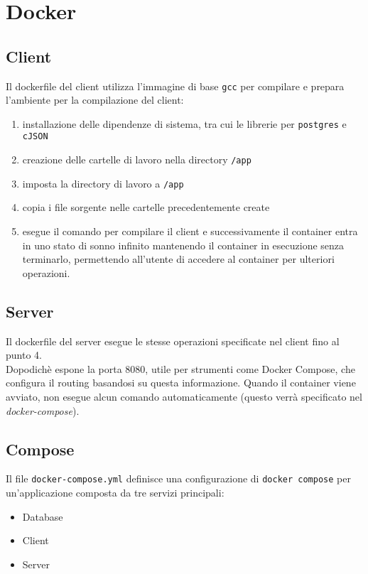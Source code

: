 \documentclass[]{report}
\begin{document}
\chapter{Docker}
\section{Client}
Il dockerfile del client utilizza l'immagine di base \texttt{gcc} per compilare e prepara l'ambiente per la compilazione del client:
\begin{enumerate}
	\item installazione delle dipendenze di sistema, tra cui le librerie per \texttt{postgres} e \texttt{cJSON}
	\item creazione delle cartelle di lavoro nella directory \texttt{/app}
	\item imposta la directory di lavoro a \texttt{/app}
	\item copia i file sorgente nelle cartelle precedentemente create
	\item esegue il comando per compilare il client e successivamente il container entra in uno stato di sonno infinito mantenendo il container in esecuzione senza terminarlo, permettendo all'utente di accedere al container per ulteriori operazioni.
\end{enumerate}

\section{Server}
Il dockerfile del server esegue le stesse operazioni specificate nel client fino al punto 4.\\
Dopodichè espone la porta 8080, utile per strumenti come Docker Compose, che configura il routing basandosi su questa informazione.\sskip
Quando il container viene avviato, non esegue alcun comando automaticamente (questo verrà specificato nel \textit{docker-compose}).

\section{Compose}
Il file \texttt{docker-compose.yml} definisce una configurazione di \texttt{docker compose} per un'applicazione composta da tre servizi principali:
\begin{itemize}
	\item Database
	\item Client
	\item Server
\end{itemize}
\end{document}
